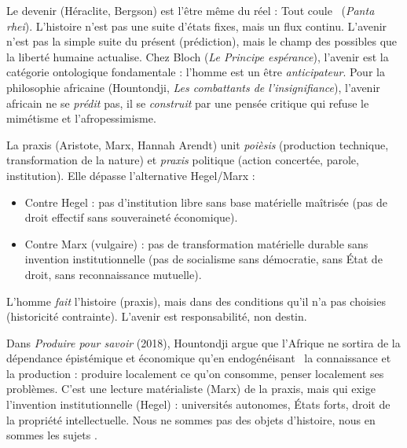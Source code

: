 \documentclass[11pt]{article}
\newcommand{\cle}[1]{{\popxbold\color{popdark}#1}}
\begin{document}
\begin{definition}
Le \cle{devenir} (Héraclite, Bergson) est l'être même du réel : \guillemotleft Tout coule \guillemotright\ (\emph{Panta rhei}). L'histoire n'est pas une suite d'états fixes, mais un flux continu. L'\cle{avenir} n'est pas la simple suite du présent (prédiction), mais le champ des \cle{possibles} que la liberté humaine actualise. Chez Bloch (\emph{Le Principe espérance}), l'avenir est la catégorie ontologique fondamentale : l'homme est un être \emph{anticipateur}. Pour la philosophie africaine (Hountondji, \emph{Les combattants de l'insignifiance}), l'avenir africain ne se \emph{prédit} pas, il se \emph{construit} par une pensée critique qui refuse le mimétisme et l'afropessimisme.
\end{definition}

\begin{aretenir}
La \cle{praxis} (Aristote, Marx, Hannah Arendt) unit \emph{poièsis} (production technique, transformation de la nature) et \emph{praxis} politique (action concertée, parole, institution). Elle dépasse l'alternative Hegel/Marx :
\begin{itemize}
\item Contre Hegel : pas d'institution libre sans base matérielle maîtrisée (pas de droit effectif sans souveraineté économique).
\item Contre Marx (vulgaire) : pas de transformation matérielle durable sans invention institutionnelle (pas de socialisme sans démocratie, sans État de droit, sans reconnaissance mutuelle).
\end{itemize}
L'homme \emph{fait} l'histoire (praxis), mais dans des conditions qu'il n'a pas choisies (historicité contrainte). L'avenir est \cle{responsabilité}, non destin.
\end{aretenir}

\begin{savaistu}
Dans \emph{Produire pour savoir} (2018), Hountondji argue que l'Afrique ne sortira de la dépendance épistémique et économique qu'en \guillemotleft endogénéisant \guillemotright\ la connaissance et la production : produire localement ce qu'on consomme, penser localement ses problèmes. C'est une lecture matérialiste (Marx) de la praxis, mais qui exige l'invention institutionnelle (Hegel) : universités autonomes, États forts, droit de la propriété intellectuelle. \guillemotleft Nous ne sommes pas des objets d'histoire, nous en sommes les sujets \guillemotright.
\end{savaistu}
\end{document}
